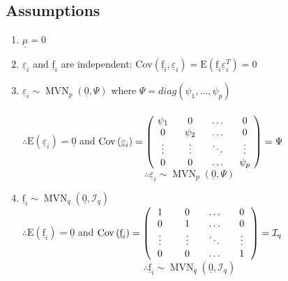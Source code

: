 \documentclass[a4paper,12pt,fleqn]{article}
\numberwithin{equation}{section}
\begin{document}
\subsection[Assumptions]{Assumptions}
\begin{enumerate}
	\item $\underline{\mu}=0$
	\item $\underline{\varepsilon}_i$ and $\underline{\text{f}}_i$ are independent: $\mathrm{Cov}\left(\underline{\text{f}}_i,\underline{\varepsilon}_i\right) = \mathrm{E}\left(\underline{\text{f}}_i\underline{\varepsilon}_i^T\right) = 0$
	\item $\underline{\varepsilon}_i \sim\operatorname{MVN}_p\left(\underline{0},\Psi\right)$ where $\Psi = \textit{diag}\left(\psi_1,\ldots,\psi_p\right)$\\
	\\
	$\therefore \mathrm{E}\left(\underline{\varepsilon}_i\right) = \underline{0}$ and $ \mathrm{Cov}\left(\underline{\varepsilon}_i\right) = \begin{pmatrix}
	\diagentry{\psi_1} & 0 & \ldots & 0\\
	0 & \diagentry{\psi_2}& \ldots & 0\\
	\vdots & \vdots & \diagentry{\ddots}& \vdots\\
	0 & 0 & \ldots & \diagentry{\psi_p}
	\end{pmatrix} = \Psi$
	\begin{equation}
	\label{eq:2}
	\therefore \underline{\varepsilon}_i \sim \operatorname{MVN}_p\left(\underline{0},\Psi\right)
	\end{equation}
	\item $\underline{\text{f}}_i \sim\operatorname{MVN}_q\left(\underline{0}, \mathcal{I}_q\right)$ 
	\\
	$\therefore \mathrm{E}\left(\underline{\text{f}}_i\right) = \underline{0}$ and $ \mathrm{Cov}\left(\underline{\text{f}}_i\right) = \begin{pmatrix}
	\diagentry{1} & 0 & \ldots & 0\\
	0 & \diagentry{1}& \ldots & 0\\
	\vdots & \vdots & \diagentry{\ddots}& \vdots\\
	0 & 0 & \ldots & \diagentry{1}
	\end{pmatrix} = \mathcal{I}_q$
	\begin{equation}
	\label{eq:3}
	\therefore \underline{\text{f}}_i \sim \operatorname{MVN}_q\left(\underline{0}, \mathcal{I}_q\right)
	\end{equation}
\end{enumerate}
\end{document}
